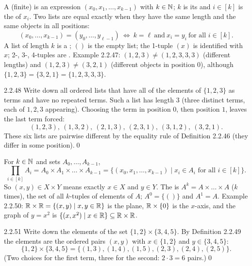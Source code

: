 
\begin{key}
A (finite)  is an expression $(x_0,x_1,\dots,x_{k-1})$ with $k\in\mathbb{N}$; $k$ is its  and $i\in[k]$ is the  of $x_i$. Two lists are equal exactly when they have the same length and the same objects in all positions:
\[
(x_0,\dots,x_{k-1})=(y_0,\dots,y_{\ell-1})\ \Leftrightarrow\ k=\ell\ \text{and}\ x_i=y_i\ \text{for all } i\in[k].
\]
A list of length $k$ is a ; $()$ is the empty list; the 1-tuple $(x)$ is identified with $x$; 2-, 3-, 4-tuples are . Example 2.2.47: $(1,2,3)\ne(1,2,3,3,3)$ (different lengths) and $(1,2,3)\ne(3,2,1)$ (different objects in position $0$), although $\{1,2,3\}=\{3,2,1\}=\{1,2,3,3,3\}$.
\end{key}

\begin{bookex}{2.2.48}
Write down all ordered lists that have all of the elements of $\{1,2,3\}$ as terms and have no repeated terms.
\solution
Such a list has length $3$ (three distinct terms, each of $1,2,3$ appearing). Choosing the term in position $0$, then position $1$, leaves the last term forced:
\[
(1,2,3),\ (1,3,2),\ (2,1,3),\ (2,3,1),\ (3,1,2),\ (3,2,1).
\]
These six lists are pairwise different by the equality rule of Definition 2.2.46 (they differ in some position).\qed
\end{bookex}

\begin{key}
For $k\in\mathbb{N}$ and sets $A_0,\dots,A_{k-1}$,
\[
\prod_{i\in[k]}A_i=A_0\times A_1\times\dots\times A_{k-1}=\{(x_0,x_1,\dots,x_{k-1})\mid x_i\in A_i\text{ for all }i\in[k]\}.
\]
So $(x,y)\in X\times Y$ means exactly $x\in X$ and $y\in Y$. The  is $A^k=A\times\dots\times A$ ($k$ times), the set of all $k$-tuples of elements of $A$; $A^0=\{()\}$ and $A^1=A$. Example 2.2.50: $\mathbb{R}\times\mathbb{R}=\{(x,y)\mid x,y\in\mathbb{R}\}$ is the plane, $\mathbb{R}\times\{0\}$ is the $x$-axis, and the graph of $y=x^2$ is $\{(x,x^2)\mid x\in\mathbb{R}\}\subseteq\mathbb{R}\times\mathbb{R}$.
\end{key}

\begin{bookex}[essential]{2.2.51}
Write down the elements of the set $\{1,2\}\times\{3,4,5\}$.
\solution
By Definition 2.2.49 the elements are the ordered pairs $(x,y)$ with $x\in\{1,2\}$ and $y\in\{3,4,5\}$:
\[
\{1,2\}\times\{3,4,5\}=\{(1,3),(1,4),(1,5),(2,3),(2,4),(2,5)\}.
\]
(Two choices for the first term, three for the second: $2\cdot3=6$ pairs.)\qed
\end{bookex}

